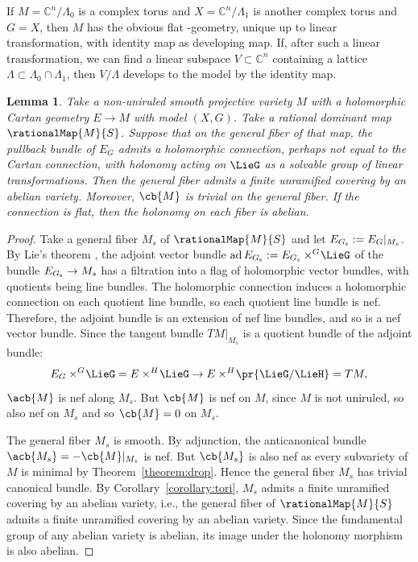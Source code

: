 \documentclass[pdftex]{sigma}
\numberwithin{equation}{section}
\newtheorem{Lemma}[Theorem]{Lemma}
\renewcommand{\C}{\mathbb{C}}
\DeclareMathOperator{\ad}{ad}
\newcommand{\amal}[3]{\ensuremath{{#1} \mathbin{\times^{#2}} \! #3}}
\begin{document}
\begin{Example}
If $M = \C^{n}/\Lambda_0$ is a complex torus and $X = \C^{n}/\Lambda_1$ is another complex torus and $G = X$, then $M$ has the obvious flat -geometry, unique up to linear transformation, with identity map as developing map.
If, after such a linear transformation, we can find a linear subspace $V \subset \C^{n}$ containing a
lattice $\Lambda \subset \Lambda_0 \cap \Lambda_1$, then $V/\Lambda$ develops to the model by the identity map.
\end{Example}

\begin{Lemma}\label{lemma:abelian.pancake}
Take a non-uniruled smooth projective variety $M$ with a holomorphic Cartan geometry $E \to M$ with model $(X, G)$.
Take a rational dominant map $\rationalMap{M}{S}$.
Suppose that on the general fiber of that map, the pullback bundle of $E_G$ admits a holomorphic connection, perhaps not equal to the Cartan connection, with holonomy acting on $\LieG$ as a solvable group of linear transformations.
Then the general fiber admits a finite unramified covering by an abelian variety.
Moreover, $\cb{M}$ is trivial on the general fiber.
If the connection is flat, then the holonomy on each fiber is abelian.
\end{Lemma}

\begin{proof}
Take a general fiber $M_{s} $ of $\rationalMap{M}{S}$ and let $E_{G_{\rm s} } := E_G|_{M_{s} }$.
By Lie's theorem \cite[Theorem 3]{Serre:2001}, the adjoint vector bundle $\ad{E_{G_{\rm s} }} := \amal{E_{G_{\rm s}}}{G}{\LieG}$ of the bundle $E_{G_{\rm s} }
\to M_{s} $ has a filtration into a flag of holomorphic vector bundles, with quotients being line bundles.
The holomorphic connection induces a holomorphic connection on each quotient line bundle, so each quotient line bundle is nef.
Therefore, the adjoint bundle is an extension of nef line bundles, and so is a nef vector bundle.
Since the tangent bundle $TM|_{M_{s} }$ is a quotient bundle of the adjoint bundle:
\[
\amal{E_G}{G}{\LieG} = \amal{E}{H}{\LieG} \to \amal{E}{H}{\pr{\LieG/\LieH}} = TM,
\]
$\acb{M}$ is nef along $M_{s} $.
But $\cb{M}$ is nef on $M$, since $M$ is not uniruled, so also nef on $M_{s} $ and so $\cb{M} = 0$ on $M_{s} $.

The general fiber $M_{s} $ is smooth.
By adjunction, the anticanonical bundle $\acb{M_{s}} = - \cb{M} |_{M_{s}}$ is nef.
But $\cb{M_{s}}$ is also nef as every subvariety of $M$ is minimal by Theorem~\ref{theorem:drop}.
Hence the general fiber $M_{s}$ has trivial canonical bundle.
By Corollary~\ref{corollary:tori}, $M_{s}$ admits a finite unramified covering by an abelian variety, i.e., the general fiber of $\rationalMap{M}{S}$ admits a finite unramified covering by an abelian variety.
Since the fundamental group of any abelian variety is abelian, its image under the holonomy morphism is also abelian.
\end{proof}
\end{document}
